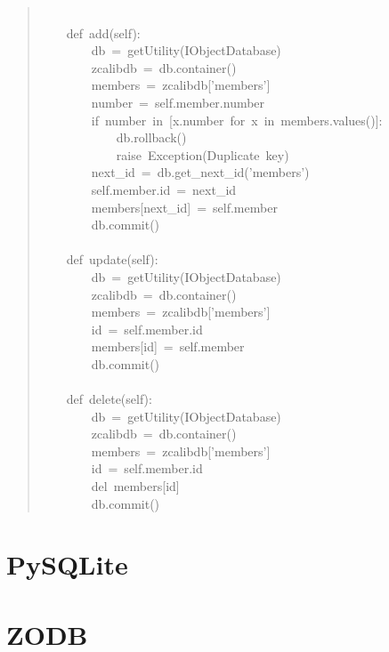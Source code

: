 \documentclass[14pt,a4paper,openany,twoside,final]{extbook}
\begin{document}
\begin{quote}
{~\\
~~~~def~add(self):\\
~~~~~~~~db~=~getUtility(IObjectDatabase)\\
~~~~~~~~zcalibdb~=~db.container()\\
~~~~~~~~members~=~zcalibdb{[}'members'{]}\\
~~~~~~~~number~=~self.member.number\\
~~~~~~~~if~number~in~{[}x.number~for~x~in~members.values(){]}:\\
~~~~~~~~~~~~db.rollback()\\
~~~~~~~~~~~~raise~Exception(\textquotedbl{}Duplicate~key\textquotedbl{})\\
~~~~~~~~next\_id~=~db.get\_next\_id('members')\\
~~~~~~~~self.member.id~=~next\_id\\
~~~~~~~~members{[}next\_id{]}~=~self.member\\
~~~~~~~~db.commit()\\
~\\
~~~~def~update(self):\\
~~~~~~~~db~=~getUtility(IObjectDatabase)\\
~~~~~~~~zcalibdb~=~db.container()\\
~~~~~~~~members~=~zcalibdb{[}'members'{]}\\
~~~~~~~~id~=~self.member.id\\
~~~~~~~~members{[}id{]}~=~self.member\\
~~~~~~~~db.commit()\\
~\\
~~~~def~delete(self):\\
~~~~~~~~db~=~getUtility(IObjectDatabase)\\
~~~~~~~~zcalibdb~=~db.container()\\
~~~~~~~~members~=~zcalibdb{[}'members'{]}\\
~~~~~~~~id~=~self.member.id\\
~~~~~~~~del~members{[}id{]}\\
~~~~~~~~db.commit()
}
\end{quote}


\section{PySQLite%
  \label{pysqlite}%
}


\section{ZODB%
  \label{zodb}%
}
\end{document}

